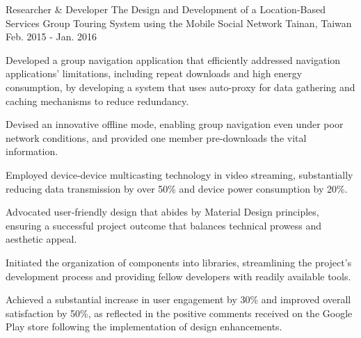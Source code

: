 

\begin{cventries}

  \cventry
    {Researcher \& Developer} %
    {The Design and Development of a Location-Based Services Group Touring System using the Mobile Social Network} %
    {Tainan, Taiwan} %
    {Feb. 2015 - Jan. 2016} %
    {
      \begin{cvitems} %
        \item {Developed a group navigation application that efficiently addressed navigation applications' limitations, including repeat downloads and high energy consumption, by developing a system that uses auto-proxy for data gathering and caching mechanisms to reduce redundancy.}
        \item {Devised an innovative offline mode, enabling group navigation even under poor network conditions, and provided one member pre‑downloads the vital information.}
        \item {Employed device‑device multicasting technology in video streaming, substantially reducing data transmission by over 50\% and device power consumption by 20\%.}
        \item {Advocated user‑friendly design that abides by Material Design principles, ensuring a successful project outcome that balances technical prowess and aesthetic appeal.}
        \item {Initiated the organization of components into libraries, streamlining the project's development process and providing fellow developers with readily available tools.}
        \item {Achieved a substantial increase in user engagement by 30\% and improved overall satisfaction by 50\%, as reflected in the positive comments received on the Google Play store following the implementation of design enhancements.}
      \end{cvitems}
    }

\end{cventries}
